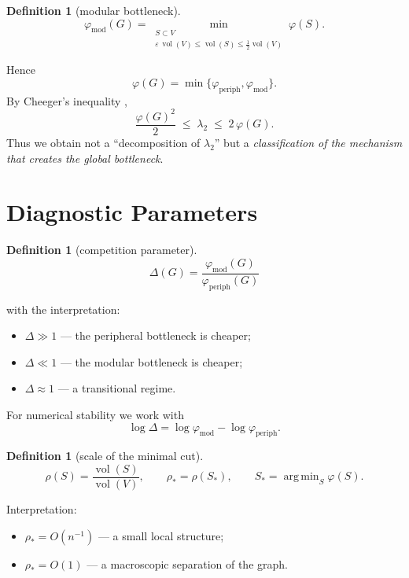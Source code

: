 \documentclass[11pt,a4paper]{article}
\theoremstyle{plain}
\theoremstyle{definition}
\newtheorem{definition}[theorem]{Definition}
\theoremstyle{remark}
\DeclareMathOperator{\vol}{vol}
\DeclareMathOperator*{\argmin}{arg\,min}
\newcommand{\periph}{\mathrm{periph}}
\newcommand{\modu}{\mathrm{mod}}
\newcommand{\Ph}{\varphi}
\newcommand{\lamtwo}{\lambda_2}
\begin{document}
\begin{definition}[modular bottleneck]
\begin{equation}
\Ph_{\modu}(G)=
\min_{\substack{S\subset V\\ \varepsilon\,\vol(V)\le\vol(S)\le\frac12\vol(V)}}\Ph(S).
\end{equation}
\end{definition}

Hence
\begin{equation}
\Ph(G)=\min\{\Ph_{\periph},\Ph_{\modu}\}.
\end{equation}
By Cheeger's inequality \cite{Cheeger1970,KannanVempalaVetta2004},
\begin{equation}
\frac{\Ph(G)^2}{2}\;\le\;\lamtwo\;\le\;2\,\Ph(G).
\label{eq:cheeger}
\end{equation}
Thus we obtain not a ``decomposition of $\lamtwo$'' but a \emph{classification
of the mechanism that creates the global bottleneck}.

\section{Diagnostic Parameters}
\label{sec:diagnostics}

\begin{definition}[competition parameter]
\begin{equation}
\boxed{\;\Delta(G)=\frac{\Ph_{\modu}(G)}{\Ph_{\periph}(G)}\;}
\end{equation}
\end{definition}
with the interpretation:
\begin{itemize}[leftmargin=*]
\item $\Delta\gg 1$ --- the peripheral bottleneck is cheaper;
\item $\Delta\ll 1$ --- the modular bottleneck is cheaper;
\item $\Delta\approx 1$ --- a transitional regime.
\end{itemize}
For numerical stability we work with
\begin{equation}
\log\Delta=\log\Ph_{\modu}-\log\Ph_{\periph}.
\end{equation}

\begin{definition}[scale of the minimal cut]
\begin{equation}
\rho(S)=\frac{\vol(S)}{\vol(V)},\qquad
\rho_*=\rho(S_*),\qquad
S_*=\argmin_{S}\Ph(S).
\end{equation}
\end{definition}
Interpretation:
\begin{itemize}[leftmargin=*]
\item $\rho_*=O(n^{-1})$ --- a small local structure;
\item $\rho_*=O(1)$ --- a macroscopic separation of the graph.
\end{itemize}
\end{document}

